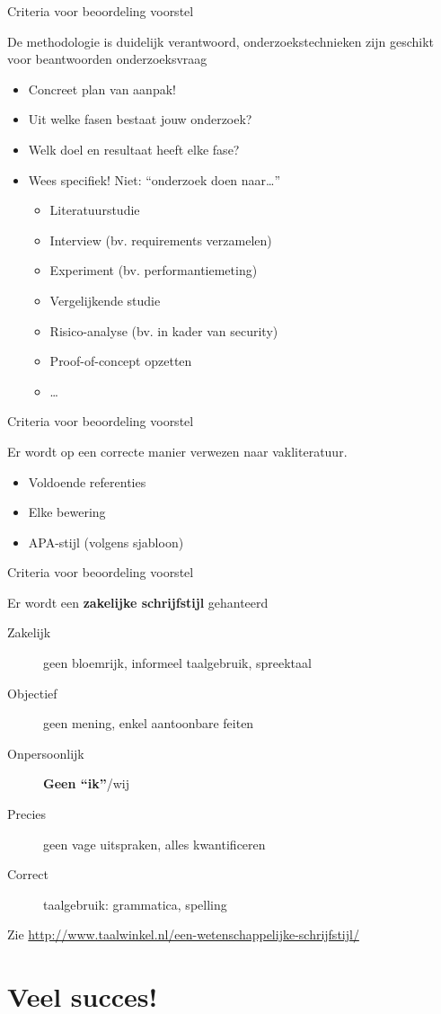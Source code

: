 \documentclass[usenames,dvipsnames]{beamer}
\begin{document}
\begin{frame}{Criteria voor beoordeling voorstel}

De methodologie is duidelijk verantwoord, onderzoekstechnieken zijn geschikt voor beantwoorden onderzoeksvraag

\begin{itemize}
  \item Concreet plan van aanpak!
  \item Uit welke fasen bestaat jouw onderzoek?
  \item Welk doel en resultaat heeft elke fase?
  \item Wees specifiek! Niet: ``onderzoek doen naar\ldots''
  \begin{itemize}
    \item Literatuurstudie
    \item Interview (bv. requirements verzamelen)
    \item Experiment (bv. performantiemeting)
    \item Vergelijkende studie
    \item Risico-analyse (bv. in kader van security)
    \item Proof-of-concept opzetten
    \item \ldots
  \end{itemize}
\end{itemize}

\end{frame}

\begin{frame}{Criteria voor beoordeling voorstel}

Er wordt op een correcte manier verwezen naar vakliteratuur.

\begin{itemize}
  \item Voldoende referenties
  \item Elke bewering
  \item APA-stijl (volgens sjabloon)
\end{itemize}

\end{frame}

\begin{frame}{Criteria voor beoordeling voorstel}

Er wordt een \textbf{zakelijke schrijfstijl} gehanteerd

\begin{description}
  \item[Zakelijk] geen bloemrijk, informeel taalgebruik, spreektaal
  \item[Objectief] geen mening, enkel aantoonbare feiten
  \item[Onpersoonlijk] \textbf{Geen ``ik''}/wij
  \item[Precies] geen vage uitspraken, alles kwantificeren
  \item[Correct] taalgebruik: grammatica, spelling
\end{description}

Zie \url{http://www.taalwinkel.nl/een-wetenschappelijke-schrijfstijl/}

\end{frame}

\section{Veel succes!}
\sectionframe{}
\end{document}
